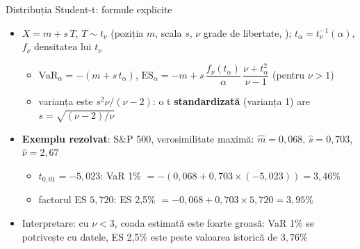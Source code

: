 \begin{frame}{Distribuția Student-t: formule explicite}
\itemsize{\footnotesize}
\begin{itemize}
    \item $X = m + s\,T$, $T \sim t_\nu$ (poziția $m$, scala $s$, $\nu$ grade de libertate, ); $t_\alpha = t_\nu^{-1}(\alpha)$, $f_\nu$ densitatea lui $t_\nu$
    \begin{itemize}
        \item $\mathrm{VaR}_\alpha = -(m + s\,t_\alpha)$, \quad $\mathrm{ES}_\alpha = -m + s\,\dfrac{f_\nu(t_\alpha)}{\alpha}\,\dfrac{\nu + t_\alpha^2}{\nu - 1}$ (pentru $\nu > 1$)
        \item varianța este $s^2\nu/(\nu - 2)$: o t \textbf{standardizată} (varianța 1) are $s = \sqrt{(\nu - 2)/\nu}$
    \end{itemize}
    \item \textbf{Exemplu rezolvat}: S\&P 500, verosimilitate maximă: $\hat m = 0{,}068$, $\hat s = 0{,}703$, $\hat\nu = 2{,}67$
    \begin{itemize}
        \item $t_{0{,}01} = -5{,}023$: VaR 1\% $= -(0{,}068 + 0{,}703 \times (-5{,}023)) = 3{,}46\%$
        \item factorul ES $5{,}720$: ES 2,5\% $= -0{,}068 + 0{,}703 \times 5{,}720 = 3{,}95\%$
    \end{itemize}
    \item Interpretare: cu $\nu < 3$, coada estimată este foarte groasă: VaR 1\% se potrivește cu datele, ES 2,5\% este peste valoarea istorică de $3{,}76\%$
\end{itemize}
\end{frame}

